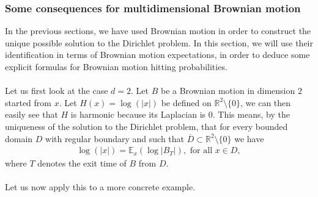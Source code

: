 \documentclass[../mainfile.tex]{subfiles}
\begin{document}
\subsubsection{Some consequences for multidimensional Brownian motion}
In the previous sections, we have used Brownian motion in order to construct the unique possible solution to the Dirichlet problem. In this section, we will use their identification in terms of Brownian motion expectations, in order to deduce some explicit formulas for Brownian motion hitting probabilities. 
\\\\
Let us first look at the case $d=2$. Let $B$ be a Brownian motion in dimension $2$ started from $x$. Let $H(x)= \log ( |x|)$ be defined on $\mathbb{R}^2 \setminus \{0\}$, we can then easily see that $H$ is harmonic because its Laplacian is $0$. This means, by the uniqueness of the solution to the Dirichlet problem, that for every bounded domain $D$ with regular boundary and such that $\overline{D} \subset \mathbb{R}^2 \setminus \{0\}$ we have 
\begin{align*}
\log(|x|)= \mathbb{E}_x( \log |B_T|), \text{ for all } x \in D,
\end{align*}
where $T$ denotes the exit time of $B$ from $D$. 
\\\\
Let us now apply this to a more concrete example.
\newpage
\end{document}
